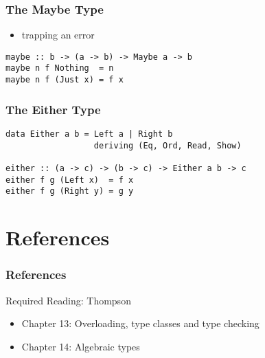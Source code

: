 \documentclass[dvipsnames]{beamer}
\theoremstyle{plain}
\begin{document}
\begin{frame}[fragile]
  \frametitle{The Maybe Type}

  \begin{itemize}
    \item trapping an error
  \end{itemize}

  \begin{exampleblock}{}
    \begin{lstlisting}
maybe :: b -> (a -> b) -> Maybe a -> b
maybe n f Nothing  = n
maybe n f (Just x) = f x
    \end{lstlisting}
  \end{exampleblock}
\end{frame}

\begin{frame}[fragile]
  \frametitle{The Either Type}

  \begin{exampleblock}{}
    \begin{lstlisting}
data Either a b = Left a | Right b
                  deriving (Eq, Ord, Read, Show)

either :: (a -> c) -> (b -> c) -> Either a b -> c
either f g (Left x)  = f x
either f g (Right y) = g y
    \end{lstlisting}
  \end{exampleblock}
\end{frame}


\section*{References}

\begin{frame}
  \frametitle{References}

  \begin{block}{Required Reading: Thompson}
    \begin{itemize}
      \item Chapter 13: \alert{Overloading, type classes and type checking}
      \item Chapter 14: \alert{Algebraic types}
    \end{itemize}
  \end{block}
\end{frame}
\end{document}
